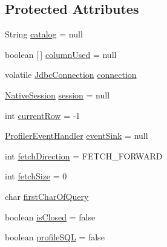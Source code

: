 \subsection*{Protected Attributes}
\begin{DoxyCompactItemize}
\item 
String \mbox{\hyperlink{classcom_1_1mysql_1_1cj_1_1jdbc_1_1result_1_1_result_set_impl_a05837dfc0f57d6e0673eec5b363f12dc}{catalog}} = null
\item 
boolean \mbox{[}$\,$\mbox{]} \mbox{\hyperlink{classcom_1_1mysql_1_1cj_1_1jdbc_1_1result_1_1_result_set_impl_a8e99c3b2c3b7b7c97aec4f77d665fa5b}{column\+Used}} = null
\item 
volatile \mbox{\hyperlink{interfacecom_1_1mysql_1_1cj_1_1jdbc_1_1_jdbc_connection}{Jdbc\+Connection}} \mbox{\hyperlink{classcom_1_1mysql_1_1cj_1_1jdbc_1_1result_1_1_result_set_impl_aa177ec5c7229b07c51ab4d114d284c94}{connection}}
\item 
\mbox{\hyperlink{classcom_1_1mysql_1_1cj_1_1_native_session}{Native\+Session}} \mbox{\hyperlink{classcom_1_1mysql_1_1cj_1_1jdbc_1_1result_1_1_result_set_impl_a208c3fe39186b5c806f01c2122589bfb}{session}} = null
\item 
int \mbox{\hyperlink{classcom_1_1mysql_1_1cj_1_1jdbc_1_1result_1_1_result_set_impl_ac695da410eeee2422b717bb50e8a3518}{current\+Row}} = -\/1
\item 
\mbox{\hyperlink{interfacecom_1_1mysql_1_1cj_1_1log_1_1_profiler_event_handler}{Profiler\+Event\+Handler}} \mbox{\hyperlink{classcom_1_1mysql_1_1cj_1_1jdbc_1_1result_1_1_result_set_impl_a142f9bf4978b7c29430315650f472c27}{event\+Sink}} = null
\item 
int \mbox{\hyperlink{classcom_1_1mysql_1_1cj_1_1jdbc_1_1result_1_1_result_set_impl_a0bff4926d818afda3b1a31f68816f15a}{fetch\+Direction}} = F\+E\+T\+C\+H\+\_\+\+F\+O\+R\+W\+A\+RD
\item 
int \mbox{\hyperlink{classcom_1_1mysql_1_1cj_1_1jdbc_1_1result_1_1_result_set_impl_a1346462740391fb74871f1be4f9fde2b}{fetch\+Size}} = 0
\item 
char \mbox{\hyperlink{classcom_1_1mysql_1_1cj_1_1jdbc_1_1result_1_1_result_set_impl_a7c208697752d60ed576d9975f66a12a8}{first\+Char\+Of\+Query}}
\item 
boolean \mbox{\hyperlink{classcom_1_1mysql_1_1cj_1_1jdbc_1_1result_1_1_result_set_impl_a235f24cf3be20c9d1dea2f9c75a20a21}{is\+Closed}} = false
\item 
boolean \mbox{\hyperlink{classcom_1_1mysql_1_1cj_1_1jdbc_1_1result_1_1_result_set_impl_a1c0f5f7e20e2f1dd39e0a46d918f60ba}{profile\+S\+QL}} = false

\end{DoxyCompactItemize}

